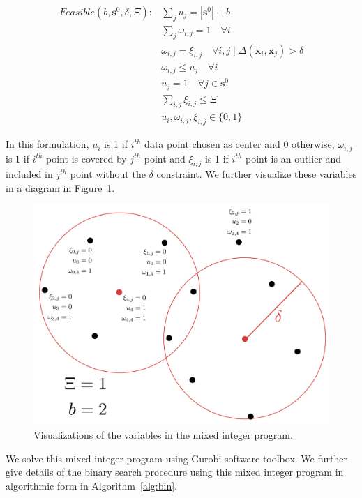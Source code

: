 \documentclass{article}
\begin{document}
\begin{equation}
\begin{aligned}
Feasible(b,\mathbf{s}^0,\delta, \Xi):  &\sum_j  u_j = |\mathbf{s}^0|+ b \\
&\sum_j \omega_{i,j} = 1 \quad \forall  i \\
   &\omega_{i,j} = \xi_{i,j} \quad  \forall i,j \mid   \Delta(\mathbf{x}_i,\mathbf{x}_j)  > \delta \\
   &\omega_{i,j} \leq u_j \quad \forall  i \\
   &u_j =1 \quad \forall j\in \mathbf{s}^0 \\
   & \sum_{i,j} \xi_{i,j} \leq \Xi \\
   & u_i, \omega_{i,j}, \xi_{i,j} \in \{0,1\}
\end{aligned}
\end{equation}

In this formulation, $u_i$ is 1 if $i^{th}$ data point chosen as center and $0$ otherwise, $\omega_{i,j}$ is $1$ if $i^{th}$ point is covered by $j^{th}$ point and $\xi_{i,j}$ is 1 if $i^{th}$ point is an outlier and included in $j^{th}$ point without the $\delta$ constraint. We further visualize these variables in a diagram in Figure~\ref{mip}.

\begin{figure}[h]
\includegraphics[width=\columnwidth]{mip.pdf}
\caption{Visualizations of the variables in the mixed integer program.}
\label{mip}
\end{figure}

We solve this mixed integer program using Gurobi\cite{gurobi} software toolbox. We further give details of the binary search procedure using this mixed integer program in algorithmic form in Algorithm~\ref{alg:bin}. 
\end{document}
